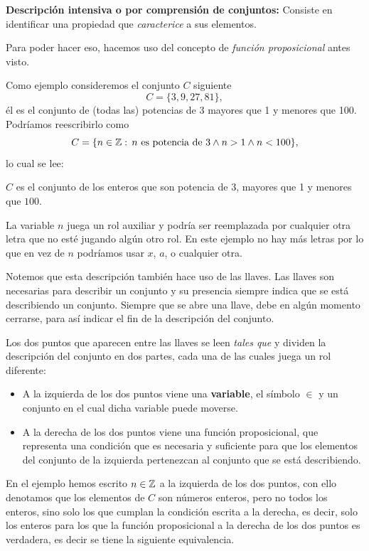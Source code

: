 \textbf{Descripci\'on intensiva o por comprensi\'on de conjuntos:} 
Consiste en identificar una propiedad que {\em caracterice} a sus elementos.

Para poder hacer eso, hacemos uso del concepto de 
{\em función proposicional} antes visto.

Como ejemplo consideremos el conjunto $C$ siguiente
$$
	C = \{3,9,27,81\},
$$
\'el es el conjunto de (todas las) potencias de 3 mayores que 1 
y menores que 100.
Podríamos reescribirlo como
$$
	C=\{n\in \mathbb{Z}:\, n \mbox{ es potencia de } 3\wedge n > 1 \wedge n < 100\},
$$
lo cual se lee:
\begin{center}
	$C$ es el conjunto de los enteros que 
	son potencia de 3, mayores que 1 y menores que $100$.
\end{center}


La variable $n$ juega un rol auxiliar 
y podría ser reemplazada por cualquier 
otra letra que no esté jugando algún otro rol. 
En este ejemplo no hay más letras
por lo que en vez de $n$ podríamos usar $x$, $a$, o cualquier otra.

Notemos que esta descripci\'on también hace uso de las llaves.
Las llaves son necesarias para describir un conjunto 
y su presencia siempre indica que se está describiendo un conjunto. 
Siempre que se abre una llave, debe en algún momento cerrarse, 
para así indicar el fin de la descripción del conjunto.

Los dos puntos que aparecen entre las llaves se leen {\emph{tales que}} y 
dividen la descripción del conjunto en dos partes, 
cada una de las cuales juega un rol diferente:
\begin{itemize}
	\item A la izquierda de los dos puntos viene una {\bf variable}, el
		s\'imbolo $\in$ y un
		conjunto en el cual dicha variable puede moverse.
	
	\item A la derecha de los dos puntos viene una función proposicional, 
		que representa una condición que es necesaria y 
		suficiente para que los elementos del conjunto 
		de la izquierda pertenezcan al conjunto que se está describiendo.
\end{itemize}

En el ejemplo hemos escrito $n\in\mathbb{Z}$ a la izquierda
de los dos puntos, con ello denotamos que los elementos de $C$
son n\'umeros enteros, pero no todos los enteros, sino solo los que
cumplan la condici\'on escrita a la derecha, es decir, solo los enteros para
los que la función proposicional a la derecha de los dos puntos es verdadera, es decir se tiene la siguiente equivalencia.

